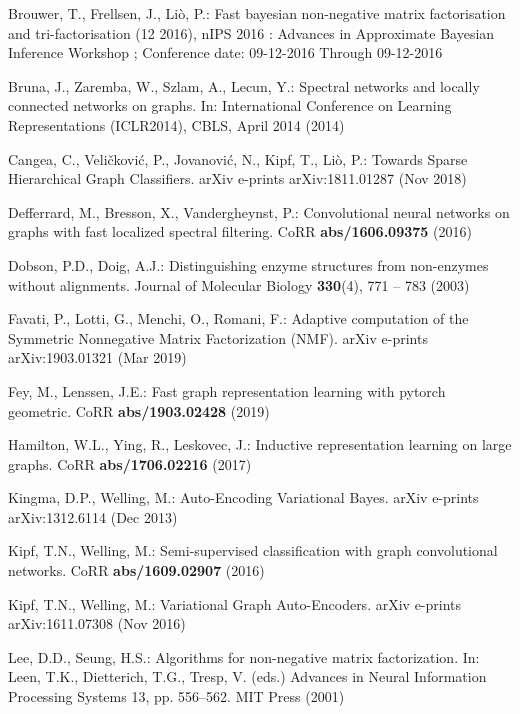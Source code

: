 \documentclass[runningheads]{llncs}
\begin{document}
\begin{thebibliography}{10}
Brouwer, T., Frellsen, J., Li{\`o}, P.: Fast bayesian non-negative matrix
  factorisation and tri-factorisation (12 2016), nIPS 2016 : Advances in
  Approximate Bayesian Inference Workshop ; Conference date: 09-12-2016 Through
  09-12-2016

Bruna, J., Zaremba, W., Szlam, A., Lecun, Y.: Spectral networks and locally
  connected networks on graphs. In: International Conference on Learning
  Representations (ICLR2014), CBLS, April 2014 (2014)

{Cangea}, C., {Veli{\v{c}}kovi{\'c}}, P., {Jovanovi{\'c}}, N., {Kipf}, T.,
  {Li{\`o}}, P.: {Towards Sparse Hierarchical Graph Classifiers}. arXiv
  e-prints arXiv:1811.01287 (Nov 2018)

Defferrard, M., Bresson, X., Vandergheynst, P.: Convolutional neural networks
  on graphs with fast localized spectral filtering. CoRR
  \textbf{abs/1606.09375} (2016)

Dobson, P.D., Doig, A.J.: Distinguishing enzyme structures from non-enzymes
  without alignments. Journal of Molecular Biology  \textbf{330}(4),  771 --
  783 (2003)

{Favati}, P., {Lotti}, G., {Menchi}, O., {Romani}, F.: {Adaptive computation of
  the Symmetric Nonnegative Matrix Factorization (NMF)}. arXiv e-prints
  arXiv:1903.01321 (Mar 2019)

Fey, M., Lenssen, J.E.: Fast graph representation learning with pytorch
  geometric. CoRR  \textbf{abs/1903.02428} (2019)

Hamilton, W.L., Ying, R., Leskovec, J.: Inductive representation learning on
  large graphs. CoRR  \textbf{abs/1706.02216} (2017)

{Kingma}, D.P., {Welling}, M.: {Auto-Encoding Variational Bayes}. arXiv
  e-prints arXiv:1312.6114 (Dec 2013)

Kipf, T.N., Welling, M.: Semi-supervised classification with graph
  convolutional networks. CoRR  \textbf{abs/1609.02907} (2016)

{Kipf}, T.N., {Welling}, M.: {Variational Graph Auto-Encoders}. arXiv e-prints
  arXiv:1611.07308 (Nov 2016)

Lee, D.D., Seung, H.S.: Algorithms for non-negative matrix factorization. In:
  Leen, T.K., Dietterich, T.G., Tresp, V. (eds.) Advances in Neural Information
  Processing Systems 13, pp. 556--562. MIT Press (2001)


\end{thebibliography}
\end{document}
